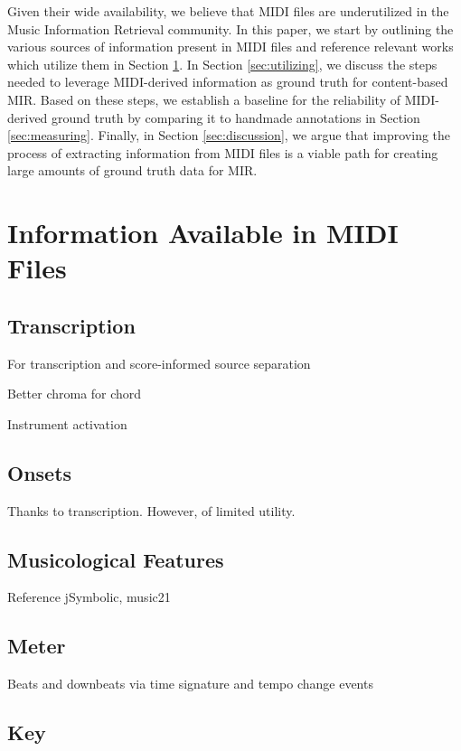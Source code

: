 \documentclass{article}
\begin{document}
Given their wide availability, we believe that MIDI files are underutilized in the Music Information Retrieval community.
In this paper, we start by outlining the various sources of information present in MIDI files and reference relevant works which utilize them in Section \ref{sec:information}.
In Section \ref{sec:utilizing}, we discuss the steps needed to leverage MIDI-derived information as ground truth for content-based MIR.
Based on these steps, we establish a baseline for the reliability of MIDI-derived ground truth by comparing it to handmade annotations in Section \ref{sec:measuring}.
Finally, in Section \ref{sec:discussion}, we argue that improving the process of extracting information from MIDI files is a viable path for creating large amounts of ground truth data for MIR.

\section{Information Available in MIDI Files}
\label{sec:information}

\subsection{Transcription}

For transcription and score-informed source separation

Better chroma for chord

Instrument activation

\subsection{Onsets}

Thanks to transcription.  However, of limited utility.

\subsection{Musicological Features}

Reference jSymbolic, music21

\subsection{Meter}

Beats and downbeats via time signature and tempo change events

\subsection{Key}
\end{document}
